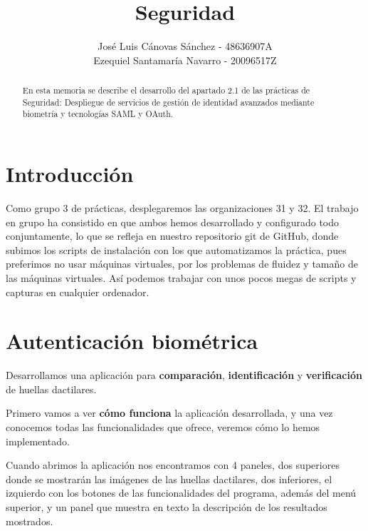 \documentclass[]{article}
\title{Seguridad}
\author{José Luis Cánovas Sánchez - 48636907A\\Ezequiel Santamaría Navarro - 20096517Z}
\begin{document}
\maketitle

\begin{abstract}
En esta memoria se describe el desarrollo del apartado 2.1 de las prácticas de Seguridad: Despliegue de servicios de gestión de identidad avanzados mediante biometría y tecnologías SAML y OAuth.
\end{abstract}

\tableofcontents


\section{Introducción}

Como grupo 3 de prácticas, desplegaremos las organizaciones 31 y 32.
El trabajo en grupo ha consistido en que ambos hemos desarrollado y configurado todo conjuntamente, lo que se refleja en nuestro repositorio git de GitHub, donde subimos los scripts de instalación con los que automatizamos la práctica, pues preferimos no usar máquinas virtuales, por los problemas de fluidez y tamaño de las máquinas virtuales. Así podemos trabajar con unos pocos megas de scripts y capturas en cualquier ordenador.




\section{Autenticación biométrica}

Desarrollamos una aplicación para \textbf{comparación}, \textbf{identificación} y \textbf{verificación} de huellas dactilares.

\hfil

Primero vamos a ver \textbf{cómo funciona} la aplicación desarrollada, y una vez conocemos todas las funcionalidades que ofrece, veremos cómo lo hemos implementado.

\hfil

Cuando abrimos la aplicación nos encontramos con 4 paneles, dos superiores donde se mostrarán las imágenes de las huellas dactilares, dos inferiores, el izquierdo con los botones de las funcionalidades del programa, además del menú superior, y un panel que muestra en texto la descripción de los resultados mostrados.
\end{document}
